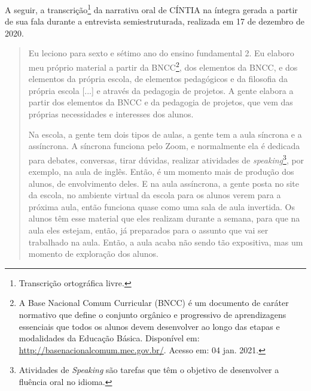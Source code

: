 \documentclass{textolivre}
\begin{document}
A seguir, a transcrição\footnote{Transcrição ortográfica livre.} da narrativa oral de CÍNTIA na íntegra gerada a partir de sua fala durante a entrevista semiestruturada, realizada em 17 de dezembro de 2020.

\begin{quote}
Eu leciono para sexto e sétimo ano do ensino fundamental 2. Eu elaboro meu próprio material a partir da BNCC\footnote{A Base Nacional Comum Curricular (BNCC) é um documento de caráter normativo que define o conjunto orgânico e progressivo de aprendizagens essenciais que todos os alunos devem desenvolver ao longo das etapas e modalidades da Educação Básica. Disponível em: \url{ http://basenacionalcomum.mec.gov.br/}. Acesso em: 04 jan. 2021.}, dos elementos da BNCC, e dos elementos da própria escola, de elementos pedagógicos e da filosofia da própria escola [...] e através da pedagogia de projetos. A gente elabora a partir dos elementos da BNCC e da pedagogia de projetos, que vem das próprias necessidades e interesses dos alunos.

Na escola, a gente tem dois tipos de aulas, a gente tem a aula síncrona e a assíncrona. A síncrona funciona pelo Zoom, e normalmente ela é dedicada para debates, conversas, tirar dúvidas, realizar atividades de \emph{speaking}\footnote{Atividades de \emph{Speaking} são tarefas que têm o objetivo de desenvolver a fluência oral no idioma.}, por exemplo, na aula de inglês. Então, é um momento mais de produção dos alunos, de envolvimento deles. E na aula assíncrona, a gente posta no site da escola, no ambiente virtual da escola para os alunos verem para a próxima aula, então funciona quase como uma sala de aula invertida. Os alunos têm esse material que eles realizam durante a semana, para que na aula eles estejam, então, já preparados para o assunto que vai ser trabalhado na aula. Então, a aula acaba não sendo tão expositiva, mas um momento de exploração dos alunos.


\end{quote}
\end{document}
